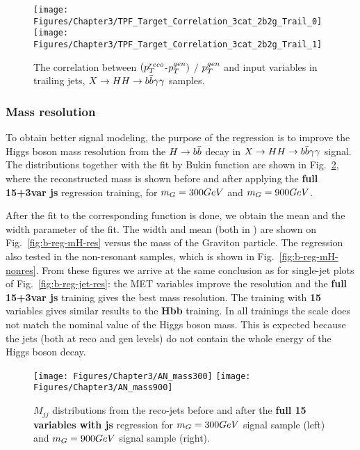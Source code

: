 \begin{figure*}[bth]
  \centering
  \texttt{[image: Figures/Chapter3/TPF\_Target\_Correlation\_3cat\_2b2g\_Trail\_0]}\hfil
  \texttt{[image: Figures/Chapter3/TPF\_Target\_Correlation\_3cat\_2b2g\_Trail\_1]}\hfil
  \caption{The correlation between $(p_{T}^{reco}$-$p_{T}^{gen})$ $/$ $p_{T}^{gen}$
  and input variables in trailing jets, $X\to HH\to b\bar{b}\gamma\gamma$ samples.}
  \label{fig:b-reg-ptcor-Trail}
\end{figure*}

\clearpage

\subsubsection{Mass resolution}

To obtain better signal modeling, the purpose of the regression is to improve the Higgs boson mass resolution from the $H\to b\bar{b}$ decay in $X\to HH\to b\bar{b}\gamma\gamma$ signal. 
The distributions together with the fit by Bukin function are shown in
Fig.~\ref{fig:b-reg-mH-fit-reco}, where the reconstructed mass is
shown before and after applying the \textbf{full 15+3var js} regression training, for $m_G
= 300GeV$ and $m_G = 900GeV$.

After the fit to the corresponding function is done, we obtain the mean and the width parameter of the fit. 
The width and mean (both in \GeV) are shown on Fig.~\ref{fig:b-reg-mH-res} versus the mass of the Graviton particle. 
The regression also tested in the non-resonant samples, which is shown in Fig.~\ref{fig:b-reg-mH-nonres}.
From these figures we arrive at the same conclusion
as for single-jet plots of Fig.~\ref{fig:b-reg-jet-res}: the MET
variables improve the resolution and the \textbf{full 15+3var js}
training gives the best mass resolution. The training with \textbf{15}
variables gives similar results to the \textbf{Hbb} training.  In all
trainings the scale does not match the nominal value of the Higgs
boson mass. This is expected because the jets (both at reco and gen
levels) do not contain the whole energy of the Higgs boson decay.

\begin{figure*}[thb]
  \centering
  \texttt{[image: Figures/Chapter3/AN\_mass300]}\hfil
  \texttt{[image: Figures/Chapter3/AN\_mass900]}\hfil
  \caption{$M_{jj}$ distributions from the reco-jets before and after
    the \textbf{full 15 variables with js} regression for $m_G=300GeV$ signal sample
    (left) and $m_G=900GeV$ signal sample (right).}
  \label{fig:b-reg-mH-fit-reco}
\end{figure*}


